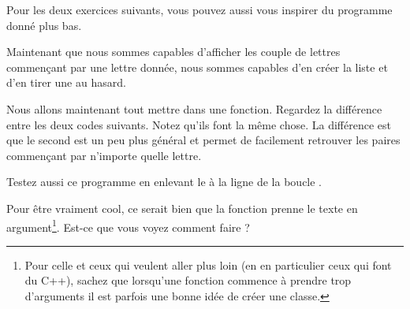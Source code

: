 Pour les deux exercices suivants, vous pouvez aussi vous inspirer du programme  donné plus bas.

Maintenant que nous sommes capables d'afficher les couple de lettres commençant par une lettre donnée, nous sommes capables d'en créer la liste et d'en tirer une au hasard.


Nous allons maintenant tout mettre dans une fonction. Regardez la différence entre les deux codes suivants. Notez qu'ils font la même chose. La différence est que le second est un peu plus général et permet de facilement retrouver les paires commençant par n'importe quelle lettre.



Testez aussi ce programme en enlevant le \info{[1:]} à la ligne de la boucle .



Pour être vraiment cool, ce serait bien que la fonction  prenne le texte en argument\footnote{Pour celle et ceux qui veulent aller plus loin (en en particulier ceux qui font du C++), sachez que lorsqu'une fonction commence à prendre trop d'arguments il est parfois une bonne idée de créer une classe.}. Est-ce que vous voyez comment faire ?

